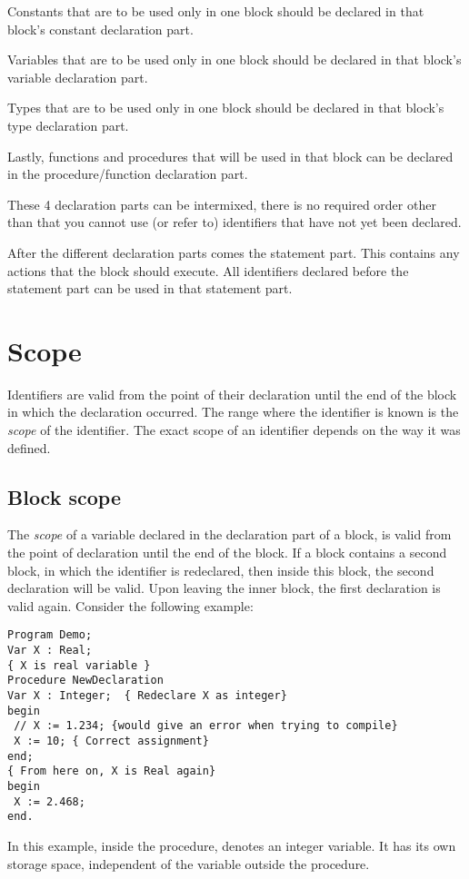 Constants that are to be used only in one block should be declared in that
block's constant declaration part.

Variables that are to be used only in one block should be declared in that
block's variable declaration part.

Types that are to be used only in one block should be declared in that
block's type declaration part.

Lastly, functions and procedures that will be used in that block can be
declared in the procedure/function declaration part.

These 4 declaration parts can be intermixed, there is no required order
other than that you cannot use (or refer to) identifiers that have not 
yet been declared.

After the different declaration parts comes the statement part. This
contains any actions that the block should execute. All identifiers 
declared before the statement part can be used in that statement part.

\section{Scope}
Identifiers are valid from the point of their declaration until the end of
the block in which the declaration occurred. The range where the identifier
is known is the {\em scope} of the identifier. The exact scope of an
identifier depends on the way it was defined.
\subsection{Block scope}
The {\em scope} of a variable declared in the declaration part of a block,
is valid from the point of declaration until the end of the block.
If a block contains a second block, in which the identifier is
redeclared, then inside this block, the second declaration will be valid.
Upon leaving the inner block, the first declaration is valid again.
Consider the following example:
\begin{verbatim}
Program Demo;
Var X : Real;
{ X is real variable }
Procedure NewDeclaration
Var X : Integer;  { Redeclare X as integer}
begin
 // X := 1.234; {would give an error when trying to compile}
 X := 10; { Correct assignment}
end;
{ From here on, X is Real again}
begin
 X := 2.468;
end.
\end{verbatim}
In this example, inside the procedure,  denotes an integer variable.
It has its own storage space, independent of the variable  outside
the procedure.

